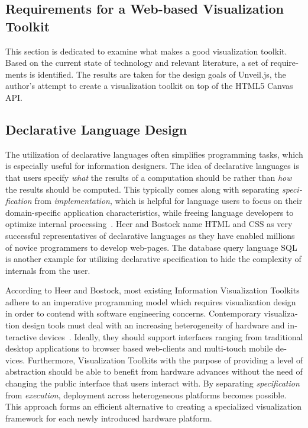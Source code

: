 \begin{english}

\chapter{Requirements for a Web-based Visualization Toolkit}
\label{cha:requirements}

This section is dedicated to examine what makes a good visualization toolkit. Based on the current state of technology and relevant literature, a set of requirements is identified. The results are taken for the design goals of Unveil.js, the author's attempt to create a visualization toolkit on top of the HTML5 Canvas API.

\section{Declarative Language Design}

The utilization of declarative languages often simplifies programming tasks, which is especially useful for information designers. The idea of declarative languages is that users specify \emph{what} the results of a computation should be rather than \emph{how} the results should be computed. This typically comes along with separating \emph{specification} from \emph{implementation}, which is helpful for language users to focus on their domain-specific application characteristics, while freeing language developers to optimize internal processing~\cite{DeclarativeLD10}. Heer and Bostock name HTML and CSS as very successful representatives of declarative languages as they have enabled millions of novice programmers to develop web-pages. The database query language SQL is another example for utilizing declarative specification to hide the complexity of internals from the user.

According to Heer and Bostock, most existing Information Visualization Toolkits adhere to an imperative programming model which requires visualization design in order to contend with software engineering concerns. Contemporary visualization design tools must deal with an increasing heterogeneity of hardware and interactive devices~\cite{DeclarativeLD10}. Ideally, they should support interfaces ranging from traditional desktop applications to browser based web-clients and multi-touch mobile devices. Furthermore, Visualization Toolkits with the purpose of providing a level of abstraction should be able to benefit from hardware advances without the need of changing the public interface that users interact with. By separating \emph{specification} from \emph{execution}, deployment across heterogeneous platforms becomes possible. This approach forms an efficient alternative to creating a specialized visualization framework for each newly introduced hardware platform.


\end{english}

